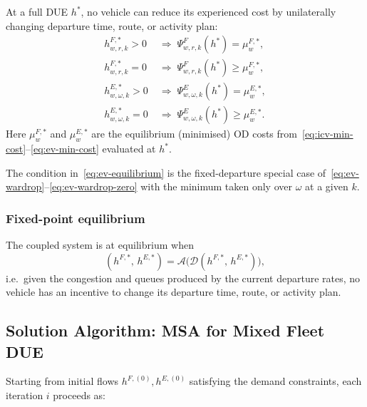 At a full DUE $h^*$, no vehicle can reduce its experienced cost by
unilaterally changing departure time, route, or activity plan:
\begin{align}
  h^{F,*}_{w,r,k} > 0 &\;\Rightarrow\;
    \Psi^F_{w,r,k}(h^*) = \mu^{F,*}_w,
    \label{eq:icv-wardrop} \\
  h^{F,*}_{w,r,k} = 0 &\;\Rightarrow\;
    \Psi^F_{w,r,k}(h^*) \ge \mu^{F,*}_w,
    \label{eq:icv-wardrop-zero} \\
  h^{E,*}_{w,\omega,k} > 0 &\;\Rightarrow\;
    \Psi^E_{w,\omega,k}(h^*) = \mu^{E,*}_w,
    \label{eq:ev-wardrop} \\
  h^{E,*}_{w,\omega,k} = 0 &\;\Rightarrow\;
    \Psi^E_{w,\omega,k}(h^*) \ge \mu^{E,*}_w.
    \label{eq:ev-wardrop-zero}
\end{align}
Here $\mu^{F,*}_w$ and $\mu^{E,*}_w$ are the equilibrium (minimised)
OD costs from~\eqref{eq:icv-min-cost}--\eqref{eq:ev-min-cost} evaluated
at $h^*$.

\begin{remark}
  The condition in~\eqref{eq:ev-equilibrium} is the fixed-departure
  special case of~\eqref{eq:ev-wardrop}--\eqref{eq:ev-wardrop-zero}
  with the minimum taken only over $\omega$ at a given $k$.
\end{remark}

\subsubsection{Fixed-point equilibrium}

The coupled system is at equilibrium when
\begin{equation}
  (h^{F,*},\, h^{E,*})
  = \mathcal{A}\!\bigl(\mathcal{D}(h^{F,*},\, h^{E,*})\bigr),
  \label{eq:fixed-point}
\end{equation}
i.e.\ given the congestion and queues produced by the current departure
rates, no vehicle has an incentive to change its departure time, route,
or activity plan.

\subsection{Solution Algorithm: MSA for Mixed Fleet DUE}
\label{sec:traffic-msa}

Starting from initial flows $h^{F,(0)}, h^{E,(0)}$ satisfying the
demand constraints, each iteration $i$ proceeds as:

